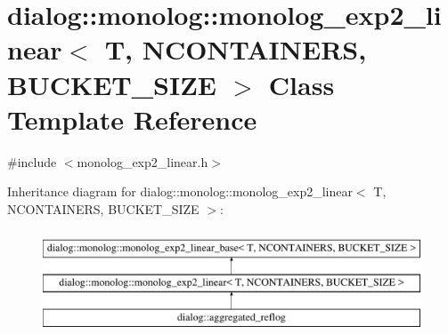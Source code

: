 \hypertarget{classdialog_1_1monolog_1_1monolog__exp2__linear}{}\section{dialog\+:\+:monolog\+:\+:monolog\+\_\+exp2\+\_\+linear$<$ T, N\+C\+O\+N\+T\+A\+I\+N\+E\+RS, B\+U\+C\+K\+E\+T\+\_\+\+S\+I\+ZE $>$ Class Template Reference}
\label{classdialog_1_1monolog_1_1monolog__exp2__linear}


{\ttfamily \#include $<$monolog\+\_\+exp2\+\_\+linear.\+h$>$}

Inheritance diagram for dialog\+:\+:monolog\+:\+:monolog\+\_\+exp2\+\_\+linear$<$ T, N\+C\+O\+N\+T\+A\+I\+N\+E\+RS, B\+U\+C\+K\+E\+T\+\_\+\+S\+I\+ZE $>$\+:\begin{figure}[H]
\begin{center}
\leavevmode
\includegraphics[height=3.000000cm]{classdialog_1_1monolog_1_1monolog__exp2__linear}
\end{center}
\end{figure}
